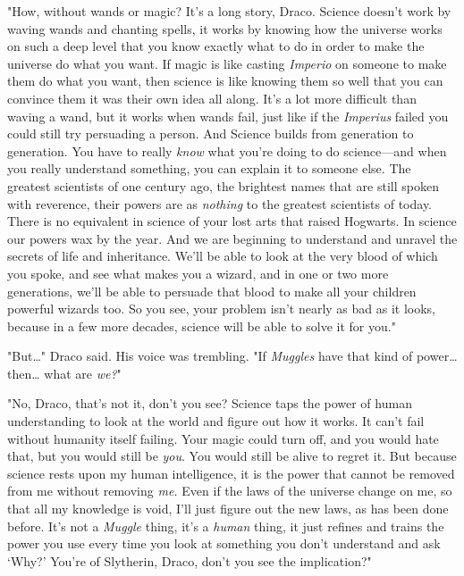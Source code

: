 "How, without wands or magic? It's a long story, Draco. Science doesn't work by 
waving wands and chanting spells, it works by knowing how the universe works on 
such a deep level that you know exactly what to do in order to make the 
universe do what you want. If magic is like casting \emph{Imperio} on someone 
to make them do what you want, then science is like knowing them so well that 
you can convince them it was their own idea all along. It's a lot more 
difficult than waving a wand, but it works when wands fail, just like if the 
\emph{Imperius} failed you could still try persuading a person. And Science 
builds from generation to generation. You have to really \emph{know} what 
you're doing to do science---and when you really understand something, you can 
explain it to someone else. The greatest scientists of one century ago, the 
brightest names that are still spoken with reverence, their powers are as 
\emph{nothing} to the greatest scientists of today. There is no equivalent in 
science of your lost arts that raised Hogwarts. In science our powers wax by 
the year. And we are beginning to understand and unravel the secrets of life 
and inheritance. We'll be able to look at the very blood of which you spoke, 
and see what makes you a wizard, and in one or two more generations, we'll be 
able to persuade that blood to make all your children powerful wizards too. So 
you see, your problem isn't nearly as bad as it looks, because in a few more 
decades, science will be able to solve it for you."

"But{\ldots}" Draco said. His voice was trembling. "If \emph{Muggles} have that 
kind of power{\ldots} then{\ldots} what are \emph{we?}"

"No, Draco, that's not it, don't you see? Science taps the power of human 
understanding to look at the world and figure out how it works. It can't fail 
without humanity itself failing. Your magic could turn off, and you would hate 
that, but you would still be \emph{you}. You would still be alive to regret it. 
But because science rests upon my human intelligence, it is the power that 
cannot be removed from me without removing \emph{me.} Even if the laws of the 
universe change on me, so that all my knowledge is void, I'll just figure out 
the new laws, as has been done before. It's not a \emph{Muggle} thing, it's a 
\emph{human} thing, it just refines and trains the power you use every time you 
look at something you don't understand and ask `Why?' You're of Slytherin, 
Draco, don't you see the implication?"

